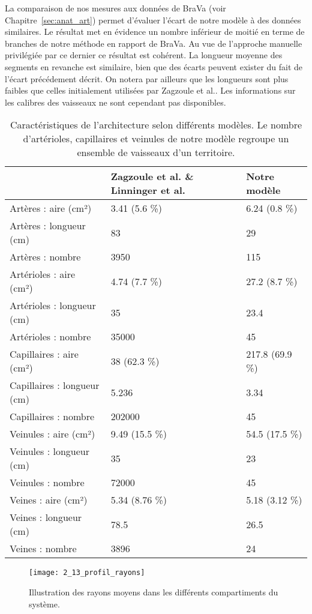 La comparaison de nos mesures aux données de BraVa (voir Chapitre~\ref{sec:anat_art}) permet d'évaluer l'écart de notre modèle à des données similaires. Le résultat met en évidence un nombre inférieur de moitié en terme de branches de notre méthode en rapport de BraVa. Au vue de l'approche manuelle privilégiée par ce dernier ce résultat est cohérent. La longueur moyenne des segments en revanche est similaire, bien que des écarts peuvent exister du fait de l'écart précédement décrit. On notera par ailleurs que les longueurs sont plus faibles que celles initialement utilisées par Zagzoule et al.. Les informations sur les calibres des vaisseaux ne sont cependant pas disponibles. \\

\begin{table}
\caption{Caractéristiques de l'architecture selon différents modèles. Le nombre d'artérioles, capillaires et veinules de notre modèle regroupe un ensemble de vaisseaux d'un territoire.}
\label{tab:tab_profil_rayons}
\begin{tabular}[!t]{l|l l}
\centering
      & Zagzoule et al. \& Linninger et al. & Notre modèle  \\
\hline
   Artères : aire (cm²) & 3.41 (5.6 \%)&  6.24  (0.8 \%) \\
   Artères : longueur (cm) & 83 &  29 \\
   Artères : nombre & 3950 &  115 \\
   Artérioles : aire (cm²) & 4.74 (7.7 \%)&  27.2  (8.7 \%)\\
   Artérioles : longueur (cm) & 35 &  23.4 \\
   Artérioles : nombre & 35000 &  45 \\
   Capillaires : aire (cm²) & 38  (62.3 \%)&  217.8  (69.9 \%)\\
   Capillaires : longueur (cm) & 5.236 &  3.34 \\
   Capillaires : nombre & 202000 &  45 \\
   Veinules : aire (cm²) & 9.49 (15.5 \%)& 54.5 (17.5 \%)\\
   Veinules : longueur (cm) & 35 &  23 \\
   Veinules : nombre & 72000 &  45 \\
   Veines : aire (cm²) & 5.34  (8.76 \%)& 5.18 (3.12 \%)\\
   Veines : longueur (cm) & 78.5 &  26.5 \\
   Veines : nombre & 3896 &  24 \\
\hline

\end{tabular}
\end{table}
\begin{figure}[!t]
\centering
\texttt{[image: 2\_13\_profil\_rayons]}
\caption{Illustration des rayons moyens dans les différents compartiments du système.}
\label{fig:2_13_profil_rayons}	
\end{figure}	

